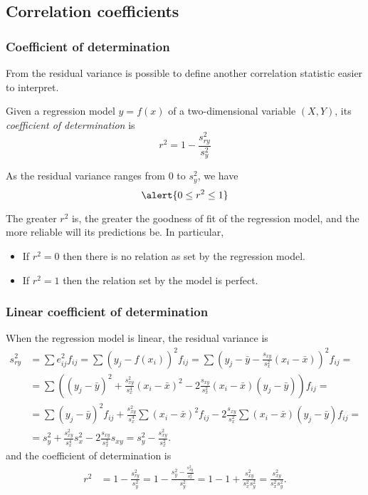 \subsection{Correlation coefficients}
\begin{frame}
\frametitle{Coefficient of determination}
From the residual variance is possible to define another correlation statistic easier to interpret.   
\begin{definition}
Given a regression model  $y=f(x)$ of a two-dimensional variable $(X,Y)$, its \emph{coefficient of determination} is
\[
r^2 = 1- \frac{s_{ry}^2}{s_y^2}
\]
\end{definition}

As the residual variance ranges from 0 to $s_y^2$, we have
\[
\alert{0\leq r^2\leq 1}
\]

The greater $r^2$ is, the greater the goodness of fit of the regression model, and the more reliable will its predictions be. 
In particular, 
\begin{itemize}
\item If $r^2 =0$ then there is no relation as set by the regression model.
\item If $r^2=1$ then the relation set by the model is perfect. 
\end{itemize}
\end{frame}


\begin{frame}
\frametitle{Linear coefficient of determination}
When the regression model is linear, the residual variance is
\begin{align*}
s_{ry}^2 & = \sum e_{ij}^2f_{ij} = \sum (y_j - f(x_i))^2f_{ij} = \sum \left(y_j - \bar y -\frac{s_{xy}}{s_x^2}(x_i-\bar x) \right)^2f_{ij}=\\
& = \sum \left((y_j - \bar y)^2 +\frac{s_{xy}^2}{s_x^4}(x_i-\bar x)^2 - 2\frac{s_{xy}}{s_x^2}(x_i-\bar x)(y_j -\bar y)\right)f_{ij} =\\
& = \sum (y_j - \bar y)^2f_{ij} +\frac{s_{xy}^2}{s_x^4}\sum (x_i-\bar x)^2f_{ij}- 2\frac{s_{xy}}{s_x^2}\sum (x_i-\bar x)(y_j -\bar y)f_{ij}=\\
& = s_y^2 + \frac{s_{xy}^2}{s_x^4}s_x^2 - 2 \frac{s_{xy}}{s_x^2}s_{xy} = s_y^2 - \frac{s_{xy}^2}{s_x^2}.
\end{align*}
and the coefficient of determination is  
\begin{align*}
r^2 &= 1- \frac{s_{ry}^2}{s_y^2} = 1- \frac{s_y^2 - \frac{s_{xy}^2}{s_x^2}}{s_y^2} = 1 - 1 + \frac{s_{xy}^2}{s_x^2s_y^2} = \frac{s_{xy}^2}{s_x^2s_y^2}.
\end{align*}
\end{frame}


